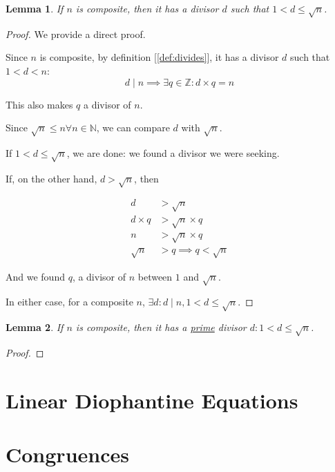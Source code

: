 \documentclass[english,notitlepage,smartquotes]{hgbreport}
\theoremstyle{definition}
\theoremstyle{remark}
\theoremstyle{plain}
\newtheorem{lemma}{Lemma}[chapter]
\begin{document}
\begin{lemma}
\label{lemma:factor-lertn}
If $n$ is composite, then it has a divisor $d$ such that $1<d\leq\sqrt n$.
\end{lemma}
\begin{proof}
We provide a direct proof.

Since $n$ is composite, by definition [\ref{def:divides}], it has a divisor $d$ such that $1<d<n$:
$$
d\mid n\implies \exists q\in\mathbb{Z}: d\times q=n
$$

This also makes $q$ a divisor of $n$.

Since $\sqrt{n}\leq n\forall n\in\mathbb{N}$, we can compare $d$ with $\sqrt{n}$.

If $1<d\leq\sqrt{n}$, we are done: we found a divisor we were seeking.

If, on the other hand, $d>\sqrt{n}$, then

\begin{align*}
d&>\sqrt{n}\\
d\times q&>\sqrt{n}\times q\\
n&>\sqrt{n}\times q\\
\sqrt{n}&>q\implies q<\sqrt{n}
\end{align*}

And we found $q$, a divisor of $n$ between $1$ and $\sqrt{n}$.

In either case, for a composite $n$, $\exists d: d\mid n, 1<d\leq\sqrt{n}$.

\end{proof}

\begin{lemma}
\label{lemma:prime-factor-lertn}
If $n$ is composite, then it has a \underline{prime} divisor $d:1<d\leq\sqrt n$.
\end{lemma}
\begin{proof}
\end{proof}
\chapter{Linear Diophantine Equations}

\chapter{Congruences}
\end{document}

